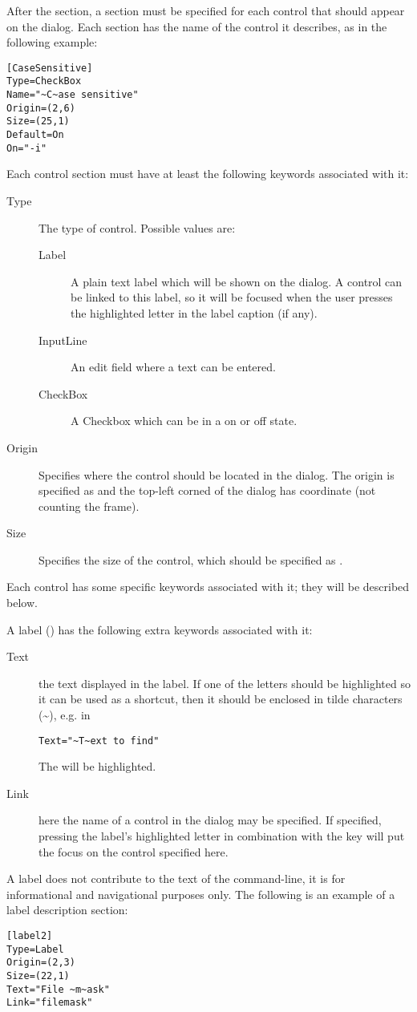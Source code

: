 After the  section, a section must be specified for each control that
should appear on the dialog. Each section has the name of the control it
describes, as in the following example:
\begin{verbatim}
[CaseSensitive]
Type=CheckBox
Name="~C~ase sensitive"
Origin=(2,6)
Size=(25,1)
Default=On
On="-i"
\end{verbatim}
Each control section  must have at least the following keywords associated
with it:
\begin{description}
\item[Type] The type of control. Possible values are:
\begin{description}
\item[Label] A plain text label which will be shown on the dialog.
A control can be linked to this label, so it will be focused when
the user presses the highlighted letter in the label caption (if any).
\item[InputLine] An edit field where a text can be entered.
\item[CheckBox] A Checkbox which can be in a on or off state.
\end{description}
\item[Origin] Specifies where the control should be located in the dialog.
The origin is specified as  and the top-left corned of
the dialog has coordinate  (not counting the frame).
\item[Size] Specifies the size of the control, which should be specified
as .
\end{description}

Each control has some specific keywords associated with it;
they will be described below.

A label () has the following extra keywords associated
with it:
\begin{description}
\item[Text] the text displayed in the label. If one of the letters should
be highlighted so it can be used as a shortcut, then it should be enclosed
in tilde characters (\~{}), e.g. in
\begin{verbatim}
Text="~T~ext to find"
\end{verbatim}
The  will be highlighted.
\item[Link] here the name of a control in the dialog may be specified.
If specified, pressing the label's highlighted letter in combination 
with the  key will put the focus on the control specified here.
\end{description}
A label does not contribute to the text of the command-line, it is for
informational and navigational purposes only. The following is an
example of a label description section:
\begin{verbatim}
[label2]
Type=Label
Origin=(2,3)
Size=(22,1)
Text="File ~m~ask"
Link="filemask"
\end{verbatim}

